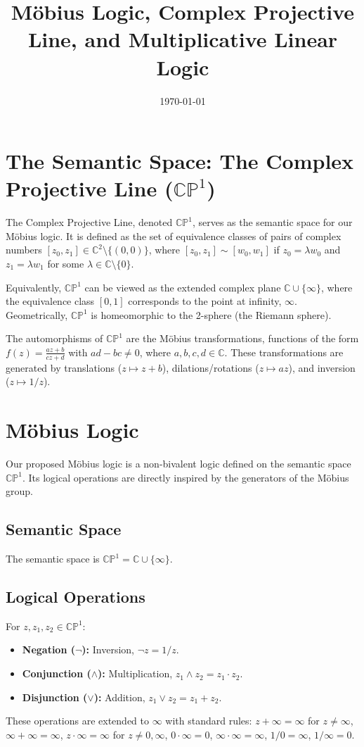 \documentclass{article}
\title{Möbius Logic, Complex Projective Line, and Multiplicative Linear Logic}
\author{}
\date{\today}
\begin{document}
	
	\maketitle
	
	\section{The Semantic Space: The Complex Projective Line ($\mathbb{CP}^1$)}
	
	The Complex Projective Line, denoted $\mathbb{CP}^1$, serves as the semantic space for our Möbius logic. It is defined as the set of equivalence classes of pairs of complex numbers $[z_0, z_1] \in \mathbb{C}^2 \setminus \{(0,0)\}$, where $[z_0, z_1] \sim [w_0, w_1]$ if $z_0 = \lambda w_0$ and $z_1 = \lambda w_1$ for some $\lambda \in \mathbb{C} \setminus \{0\}$.
	
	Equivalently, $\mathbb{CP}^1$ can be viewed as the extended complex plane $\mathbb{C} \cup \{\infty\}$, where the equivalence class $[0, 1]$ corresponds to the point at infinity, $\infty$. Geometrically, $\mathbb{CP}^1$ is homeomorphic to the 2-sphere (the Riemann sphere).
	
	The automorphisms of $\mathbb{CP}^1$ are the M\"{o}bius transformations, functions of the form $f(z) = \frac{az+b}{cz+d}$ with $ad-bc \neq 0$, where $a, b, c, d \in \mathbb{C}$. These transformations are generated by translations ($z \mapsto z+b$), dilations/rotations ($z \mapsto az$), and inversion ($z \mapsto 1/z$).
	
	\section{Möbius Logic}
	
	Our proposed M\"{o}bius logic is a non-bivalent logic defined on the semantic space $\mathbb{CP}^1$. Its logical operations are directly inspired by the generators of the M\"{o}bius group.
	
	\subsection{Semantic Space}
	The semantic space is $\mathbb{CP}^1 = \mathbb{C} \cup \{\infty\}$.
	
	\subsection{Logical Operations}
	For $z, z_1, z_2 \in \mathbb{CP}^1$:
	\begin{itemize}
		\item \textbf{Negation ($\neg$):} Inversion, $\neg z = 1/z$.
		\item \textbf{Conjunction ($\wedge$):} Multiplication, $z_1 \wedge z_2 = z_1 \cdot z_2$.
		\item \textbf{Disjunction ($\vee$):} Addition, $z_1 \vee z_2 = z_1 + z_2$.
	\end{itemize}
	These operations are extended to $\infty$ with standard rules: $z+\infty = \infty$ for $z \neq \infty$, $\infty+\infty=\infty$, $z \cdot \infty = \infty$ for $z \neq 0, \infty$, $0 \cdot \infty = 0$, $\infty \cdot \infty = \infty$, $1/0 = \infty$, $1/\infty = 0$.
	
\end{document}
